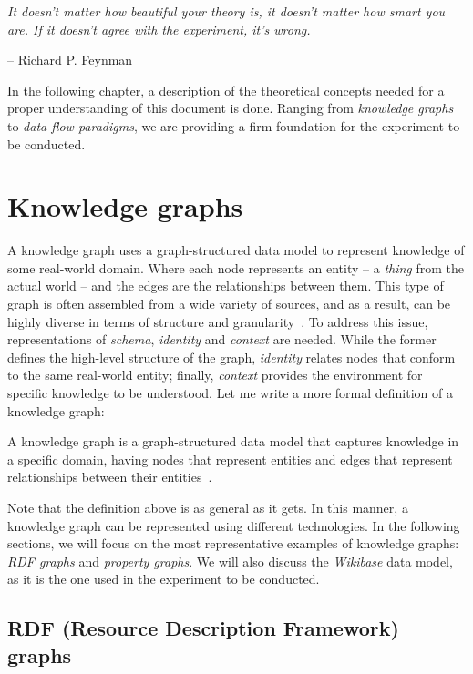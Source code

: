 \epigraph{\textit{It doesn't matter how beautiful your theory is, it doesn't matter how smart you are. If it doesn't agree with the experiment, it's wrong.}}{-- \textup{Richard P. Feynman }}

In the following chapter, a description of the theoretical concepts needed for a proper understanding of this document is done. Ranging from \textit{knowledge graphs} to \textit{data-flow paradigms}, we are providing a firm foundation for the experiment to be conducted.

\section{Knowledge graphs}
\label{section:knowledgeGraph}

A knowledge graph uses a graph-structured data model to represent knowledge of some real-world domain. Where each node represents an entity -- a \textit{thing} from the actual world -- and the edges are the relationships between them. This type of graph is often assembled from a wide variety of sources, and as a result, can be highly diverse in terms of structure and granularity~\cite{DBLP:journals/corr/abs-2003-02320}. To address this issue, representations of \textit{schema}, \textit{identity} and \textit{context} are needed. While the former defines the high-level structure of the graph, \textit{identity} relates nodes that conform to the same real-world entity; finally, \textit{context} provides the environment for specific knowledge to be understood. Let me write a more formal definition of a knowledge graph:

\begin{definition}
    A knowledge graph is a graph-structured data model that captures knowledge in a specific domain, having nodes that represent entities and edges that represent relationships between their entities~\cite{https://doi.org/10.48550/arxiv.2110.11709}.
\end{definition}

Note that the definition above is as general as it gets. In this manner, a knowledge graph can be represented using different technologies. In the following sections, we will focus on the most representative examples of knowledge graphs: \textit{RDF graphs} and \textit{property graphs}. We will also discuss the \textit{Wikibase} data model, as it is the one used in the experiment to be conducted.

\subsection{RDF (Resource Description Framework) graphs}
\label{section:RDF}

